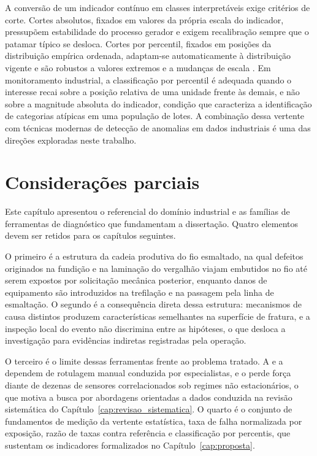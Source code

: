 A conversão de um indicador contínuo em classes interpretáveis exige critérios de corte. Cortes absolutos, fixados em valores da própria escala do indicador, pressupõem estabilidade do processo gerador e exigem recalibração sempre que o patamar típico se desloca. Cortes por percentil, fixados em posições da distribuição empírica ordenada, adaptam-se automaticamente à distribuição vigente e são robustos a valores extremos e a mudanças de escala \cite{montgomery2019statistical}. Em monitoramento industrial, a classificação por percentil é adequada quando o interesse recai sobre a posição relativa de uma unidade frente às demais, e não sobre a magnitude absoluta do indicador, condição que caracteriza a identificação de categorias atípicas em uma população de lotes. A combinação dessa vertente com técnicas modernas de detecção de anomalias em dados industriais é uma das direções exploradas neste trabalho.


\section{Considerações parciais}
\label{sec:consideracoes_cap2}

Este capítulo apresentou o referencial do domínio industrial e as famílias de ferramentas de diagnóstico que fundamentam a dissertação. Quatro elementos devem ser retidos para os capítulos seguintes.

O primeiro é a estrutura da cadeia produtiva do fio esmaltado, na qual defeitos originados na fundição e na laminação do vergalhão viajam embutidos no fio até serem expostos por solicitação mecânica posterior, enquanto danos de equipamento são introduzidos na trefilação e na passagem pela linha de esmaltação. O segundo é a consequência direta dessa estrutura: mecanismos de causa distintos produzem características semelhantes na superfície de fratura, e a inspeção local do evento não discrimina entre as hipóteses, o que desloca a investigação para evidências indiretas registradas pela operação.

O terceiro é o limite dessas ferramentas frente ao problema tratado. A  e a  dependem de rotulagem manual conduzida por especialistas, e o  perde força diante de dezenas de sensores correlacionados sob regimes não estacionários, o que motiva a busca por abordagens orientadas a dados conduzida na revisão sistemática do Capítulo~\ref{cap:revisao_sistematica}. O quarto é o conjunto de fundamentos de medição da vertente estatística, taxa de falha normalizada por exposição, razão de taxas contra referência e classificação por percentis, que sustentam os indicadores formalizados no Capítulo~\ref{cap:proposta}.

